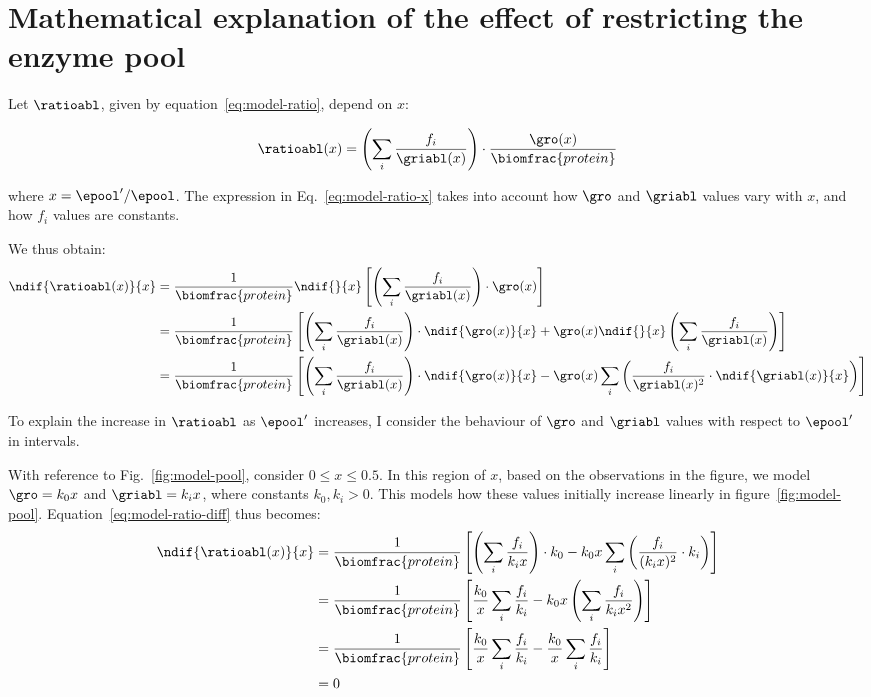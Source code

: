 \section{Mathematical explanation of the effect of restricting the enzyme pool}
\label{append:model-pool}

Let $\ratioabl$, given by equation~\ref{eq:model-ratio}, depend on $x$:

\begin{equation}
  \ratioabl(x) = \left( \sum_i \frac{f_i}{\griabl(x)} \right) \cdot \frac{\gro(x)}{\biomfrac{protein}}
  \label{eq:model-ratio-x}
\end{equation}

where $x = \epool^{\prime}/\epool$.
The expression in Eq.\ \ref{eq:model-ratio-x} takes into account how $\gro$ and $\griabl$ values vary with $x$, and how $f_{i}$ values are constants.

We thus obtain:
\begin{equation}
  \begin{aligned}
  \ndif{\ratioabl(x)}{x} &= \frac{1}{\biomfrac{protein}} \ndif{}{x} \left[ \left( \sum_i \frac{f_i}{\griabl(x)} \right) \cdot \gro(x) \right]\\
  &= \frac{1}{\biomfrac{protein}} \left[ \left( \sum_i \frac{f_i}{\griabl(x)} \right) \cdot \ndif{\gro(x)}{x} + \gro(x) \ndif{}{x} \left( \sum_i \frac{f_i}{\griabl(x)} \right) \right]\\
  &= \frac{1}{\biomfrac{protein}} \left[ \left( \sum_i \frac{f_i}{\griabl(x)} \right) \cdot \ndif{\gro(x)}{x} - \gro(x) \sum_{i}\left( \frac{f_{i}}{\griabl(x)^{2}} \cdot \ndif{\griabl(x)}{x} \right) \right]
  \end{aligned}
  \label{eq:model-ratio-diff}
\end{equation}

To explain the increase in $\ratioabl$ as $\epool^{\prime}$ increases, I consider the behaviour of $\gro$ and $\griabl$ values with respect to $\epool^{\prime}$ in intervals.

With reference to Fig.\ \ref{fig:model-pool}, consider $0 \leq x \leq 0.5$.
In this region of $x$, based on the observations in the figure, we model $\gro = k_{0}x$ and $\griabl = k_{i}x$, where constants $k_{0}, k_{i} > 0$.
This models how these values initially increase linearly in figure~\ref{fig:model-pool}.
Equation~\ref{eq:model-ratio-diff} thus becomes:
\begin{equation}
  \begin{aligned}
  \ndif{\ratioabl(x)}{x} &= \frac{1}{\biomfrac{protein}} \left[ \left( \sum_i \frac{f_i}{k_{i}x} \right) \cdot k_{0} - k_{0}x \sum_{i}\left( \frac{f_{i}}{(k_{i}x)^{2}} \cdot k_{i} \right) \right]\\
  &= \frac{1}{\biomfrac{protein}} \left[ \frac{k_{0}}{x} \sum_i \frac{f_i}{k_{i}} - k_{0}x \left( \sum_{i} \frac{f_{i}}{k_{i}x^{2}} \right) \right]\\
  &= \frac{1}{\biomfrac{protein}} \left[ \frac{k_{0}}{x} \sum_i \frac{f_i}{k_{i}} - \frac{k_{0}}{x} \sum_i \frac{f_i}{k_{i}} \right]\\
  &= 0
  \end{aligned}
  \label{eq:model-ratio-diff-smallx}
\end{equation}

